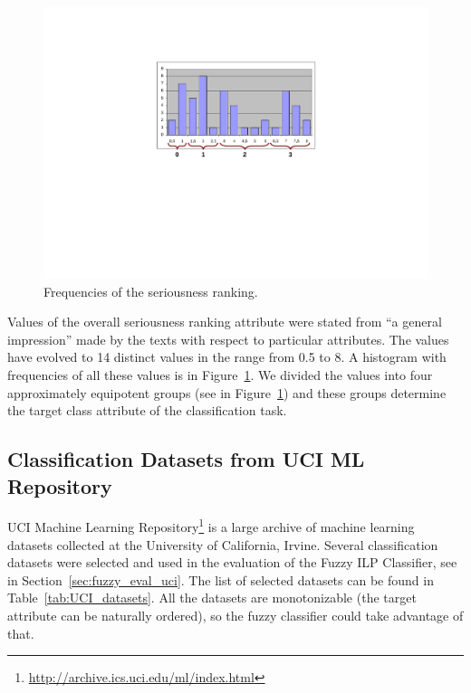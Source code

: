 \begin{figure}
\centerline{\includegraphics[angle=-90, width=0.6\hsize]{ranking_histogram}}
\caption{Frequencies of the seriousness ranking.}
\label{fig:data_ranking_histogram}
\end{figure}

Values of the overall seriousness ranking attribute were stated from ``a general impression'' made by the texts with respect to particular attributes. %
The values have evolved to 14 distinct values in the range from 0.5 to 8. 
A histogram with frequencies of all these values is in Figure~\ref{fig:data_ranking_histogram}.
We divided the values into four approximately equipotent groups 
(see in Figure~\ref{fig:data_ranking_histogram}) 
and these groups determine the target class attribute of the classification task. 






\subsection{Classification Datasets from UCI ML Repository} \label{sec:data_uci_datasets}

UCI Machine Learning Repository\footnote{\url{http://archive.ics.uci.edu/ml/index.html}} \citep{biblio:UCI} is a large archive of machine learning datasets collected at the University of California, Irvine. Several classification datasets were selected and used in the evaluation of the Fuzzy ILP Classifier, see in Section~\ref{sec:fuzzy_eval_uci}.
The list of selected datasets can be found in Table~\ref{tab:UCI_datasets}. All the datasets are monotonizable (the target attribute can be naturally ordered), so the fuzzy classifier could take advantage of that.


